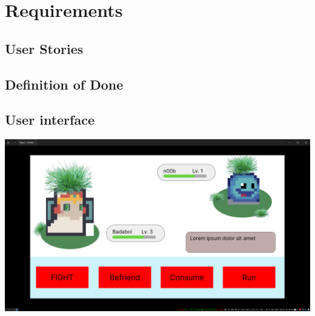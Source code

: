 \section{Requirements}

\subsection{User Stories}

\subsection{Definition of Done}

\subsection{User interface}

\includegraphics[width=\textwidth]{images/combat_figma.png}